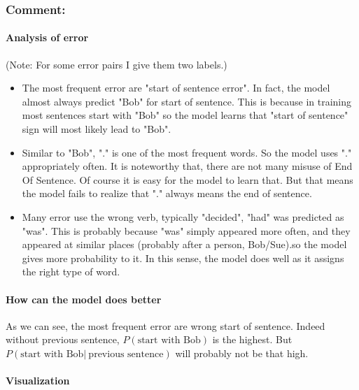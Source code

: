 \documentclass[11pt]{article}
\begin{document}
    \subsubsection{Comment:}\label{comment}

\paragraph{Analysis of error}\label{analysis-of-error}

(Note: For some error pairs I give them two labels.)

\begin{itemize}
\item
  The most frequent error are "start of sentence error". In fact, the
  model almost always predict "Bob" for start of sentence. This is
  because in training most sentences start with "Bob" so the model
  learns that "start of sentence" sign will most likely lead to "Bob".
\item
  Similar to "Bob", "." is one of the most frequent words. So the model
  uses "." appropriately often. It is noteworthy that, there are not
  many misuse of End Of Sentence. Of course it is easy for the model to
  learn that. But that means the model fails to realize that "." always
  means the end of sentence.
\item
  Many error use the wrong verb, typically "decided", "had" was
  predicted as "was". This is probably because "was" simply appeared
  more often, and they appeared at similar places (probably after a
  person, Bob/Sue).so the model gives more probability to it. In this
  sense, the model does well as it assigns the right type of word.
\end{itemize}

\paragraph{How can the model does
better}\label{how-can-the-model-does-better}

As we can see, the most frequent error are wrong start of sentence.
Indeed without previous sentence, \(P(\text{start with Bob})\) is the
highest. But \(P(\text{start with Bob} | \ \text{previous sentence})\)
will probably not be that high.

\paragraph{Visualization}\label{visualization}
\end{document}
